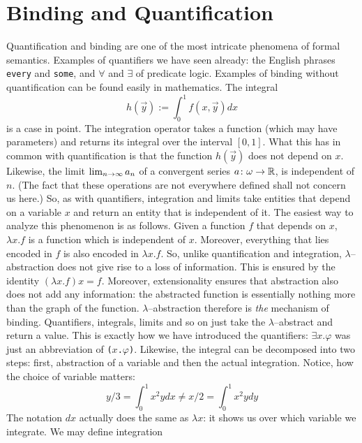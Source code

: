 \section{Binding and Quantification}
\label{kap6-4a}
%
%
%
Quantification and binding are one of the most intricate phenomena
of formal semantics. Examples of quantifiers we have seen already:
the English phrases {\tt every} and {\tt some}, and $\forall$ and 
$\exists$ of predicate logic. Examples of binding without quantification 
can be found easily in mathematics. The integral
\begin{equation}
h(\vec{y}) := \int_0^1 f(x,\vec{y})dx
\end{equation}
is a case in point. The integration operator takes a function (which
may have parameters) and returns its integral over the interval 
$[0,1]$. What this has in common with quantification is that the 
function $h(\vec{y})$ does not depend on $x$. Likewise, the limit 
$\lim_{n \rightarrow \infty} a_n$ of a convergent series 
$a \colon \omega \rightarrow \mathbb{R}$, is independent of $n$.
(The fact that these operations are not everywhere defined shall
not concern us here.) So, as with quantifiers, integration and
limits take entities that depend on a variable $x$ and return an
entity that is independent of it. The easiest way to analyze this
phenomenon is as follows. Given a function $f$ that depends on $x$,
$\lambda x.f$ is a function which is independent of $x$. Moreover,
everything that lies encoded in $f$ is also encoded in $\lambda
x.f$. So, unlike quantification and integration,
$\lambda$--abstraction does not give rise to a loss of
information. This is ensured by the identity $(\lambda x.f)x = f$.
Moreover, extensionality ensures that abstraction also does not
add any information: the abstracted function is essentially
nothing more than the graph of the function. $\lambda$--abstraction
therefore is {\it the\/} mechanism of binding. Quantifiers,
integrals, limits and so on just take the
$\lambda$--abstract and return a value. This is exactly how we
have introduced the quantifiers: $\exists x.\varphi$
was just an abbreviation of {\tt \GSi(\tlambda$x$.$\varphi$)}. 
Likewise, the integral can be decomposed into two steps: first, 
abstraction of a variable and then the actual integration. Notice, 
how the choice of variable matters:
\begin{equation}
y/3 = \int_0^1 x^2y dx \neq x/2 = \int_0^1 x^2y dy
\end{equation}
The notation $dx$ actually does the same as $\lambda x$: it shows
us over which variable we integrate. We may define integration
